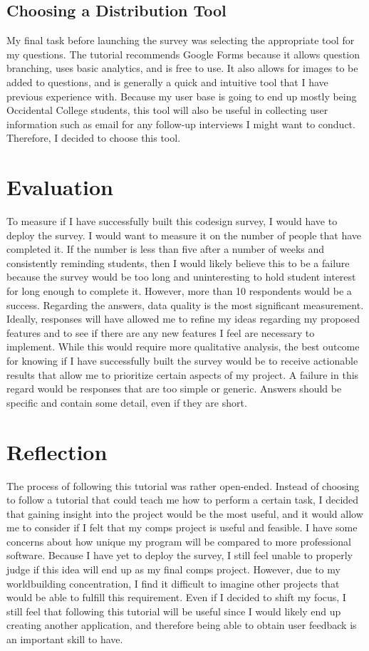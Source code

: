 \documentclass[10pt,twocolumn]{article}
\begin{document}
\subsection{Choosing a Distribution Tool}
My final task before launching the survey was selecting the appropriate tool for my questions. The tutorial recommends Google Forms because it allows question branching, uses basic analytics, and is free to use. It also allows for images to be added to questions, and is generally a quick and intuitive tool that I have previous experience with. Because my user base is going to end up mostly being Occidental College students, this tool will also be useful in collecting user information such as email for any follow-up interviews I might want to conduct. Therefore, I decided to choose this tool.
\section{Evaluation}
To measure if I have successfully built this codesign survey, I would have to deploy the survey. I would want to measure it on the number of people that have completed it. If the number is less than five after a number of weeks and consistently reminding students, then I would likely believe this to be a failure because the survey would be too long and uninteresting to hold student interest for long enough to complete it. However, more than 10 respondents would be a success. Regarding the answers, data quality is the most significant measurement. Ideally, responses will have allowed me to refine my ideas regarding my proposed features and to see if there are any new features I feel are necessary to implement. While this would require more qualitative analysis, the best outcome for knowing if I have successfully built the survey would be to receive actionable results that allow me to prioritize certain aspects of my project. A failure in this regard would be responses that are too simple or generic. Answers should be specific and contain some detail, even if they are short.  
\section{Reflection}
The process of following this tutorial was rather open-ended. Instead of choosing to follow a tutorial that could teach me how to perform a certain task, I decided that gaining insight into the project would be the most useful, and it would allow me to consider if I felt that my comps project is useful and feasible. I have some concerns about how unique my program will be compared to more professional software. Because I have yet to deploy the survey, I still feel unable to properly judge if this idea will end up as my final comps project. However, due to my worldbuilding concentration, I find it difficult to imagine other projects that would be able to fulfill this requirement. Even if I decided to shift my focus, I still feel that following this tutorial will be useful since I would likely end up creating another application, and therefore being able to obtain user feedback is an important skill to have. 
\end{document}
